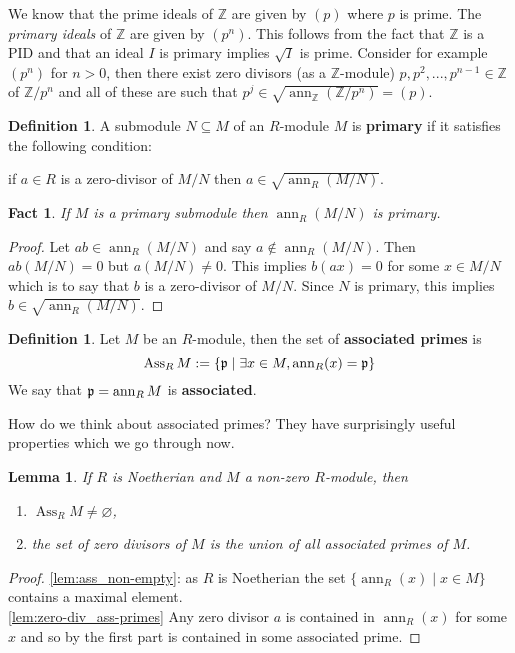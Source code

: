 \documentclass[12pt]{article}
\theoremstyle{plain}
\newtheorem{lemma}[thm]{Lemma}
\newtheorem{fact}[thm]{Fact}
\theoremstyle{definition}
\newtheorem{defn}[thm]{Definition} %
\newcommand{\bb}[1]{\mathbb{#1}}
\begin{document}
We know that the prime ideals of $\bb{Z}$ are given by $(p)$ where $p$ is prime. The \emph{primary ideals} of $\bb{Z}$ are given by $(p^n)$. This follows from the fact that $\bb{Z}$ is a PID and that an ideal $I$ is primary implies $\sqrt{I}$ is prime. Consider for example $(p^n)$ for $n > 0$, then there exist zero divisors (as a $\bb{Z}$-module) $p,p^2,...,p^{n-1} \in \bb{Z}$ of $\bb{Z}/p^n$ and all of these are such that $p^j \in \sqrt{\operatorname{ann}_\bb{Z}(\bb{Z}/p^n)} = (p)$.
\begin{defn}
A submodule $N \subseteq M$ of an $R$-module $M$ is \textbf{primary} if it satisfies the following condition:

if $a \in R$ is a zero-divisor of $M/N$ then $a \in \sqrt{\operatorname{ann}_R(M/N)}$.
\end{defn}
\begin{fact}
If $M$ is a primary submodule then $\operatorname{ann}_R(M/N)$ is primary.
\end{fact}
\begin{proof}
Let $ab \in \operatorname{ann}_R(M/N)$ and say $a \not\in \operatorname{ann}_R(M/N)$. Then $ab(M/N) = 0$ but $a(M/N) \neq 0$. This implies $b(ax) = 0$ for some $x \in M/N$ which is to say that $b$ is a zero-divisor of $M/N$. Since $N$ is primary, this implies $b \in \sqrt{\operatorname{ann}_R(M/N)}$.
\end{proof}
\begin{defn}
Let $M$ be an $R$-module, then the set of \textbf{associated primes} is \[\operatorname{Ass}_RM := \lbrace \frak{p} \mid \exists x \in M, \operatorname{ann}_R(x) = \frak{p}\rbrace\]
We say that $\frak{p} = \operatorname{ann}_RM$ is \textbf{associated}.
\end{defn}
How do we think about associated primes? They have surprisingly useful properties which we go through now.
\begin{lemma}
\label{lem:ass_nonempty_zero_div}
If $R$ is Noetherian and $M$ a non-zero $R$-module, then
\begin{enumerate}
    \item\label{lem:ass_non-empty} $\operatorname{Ass}_RM \neq \varnothing$,
    \item\label{lem:zero-div_ass-primes} the set of zero divisors of $M$ is the union of all associated primes of $M$.
\end{enumerate}
\end{lemma}
\begin{proof}
\eqref{lem:ass_non-empty}: as $R$ is Noetherian the set $\lbrace \operatorname{ann}_R(x) \mid x \in M\rbrace$ contains a maximal element.\\
%
\eqref{lem:zero-div_ass-primes} Any zero divisor $a$ is contained in $\operatorname{ann}_R(x)$ for some $x$ and so by the first part is contained in some associated prime.
\end{proof}
\end{document}

